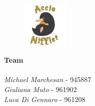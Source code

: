 \begin{titlepage}


\begin{figure}
	\centering
	\includegraphics[max width=0.2\textwidth]{../Pictures/Niffler_logo.png}
\end{figure}

\textbf{Team} \\ \\
\textit{Michael Marchesan} - 945887 \\
\textit{Giuliana Muto} - 961902 \\
\textit{Luca Di Gennaro} - 961208

\end{titlepage}
